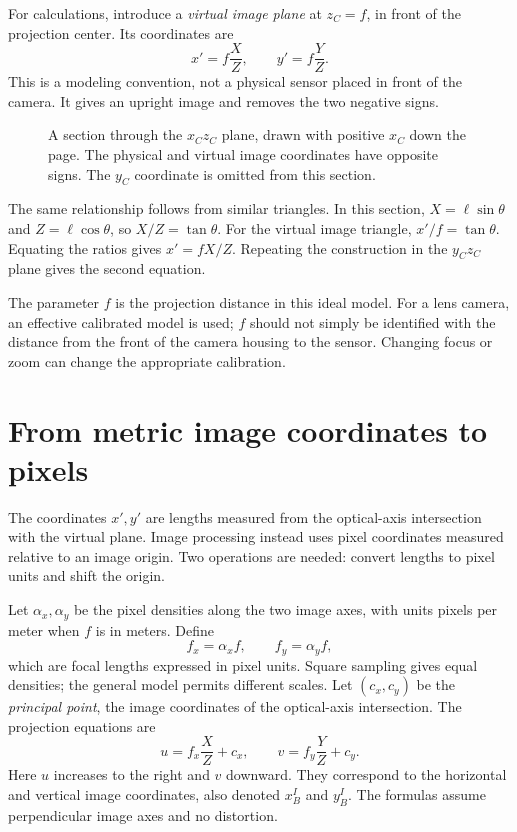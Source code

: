 For calculations, introduce a \emph{virtual image plane} at $z_C=f$,
in front of the projection center. Its coordinates are
\begin{equation}
 \boxed{x'=f\frac{X}{Z},\qquad y'=f\frac{Y}{Z}.}
 \label{eq:l07-metric}
\end{equation}
This is a modeling convention, not a physical sensor placed in front of the
camera. It gives an upright image and removes the two negative signs.

\begin{figure}[htbp]
\centering
\caption{A section through the $x_Cz_C$ plane, drawn with positive $x_C$
down the page. The physical and virtual image coordinates have opposite
signs. The $y_C$ coordinate is omitted from this section.}
\label{fig:l07-pinhole}
\end{figure}

The same relationship follows from similar triangles. In this section,
$X=\ell\sin\theta$ and $Z=\ell\cos\theta$, so $X/Z=\tan\theta$.
For the virtual image triangle, $x'/f=\tan\theta$. Equating the ratios
gives $x'=fX/Z$. Repeating the construction in the $y_Cz_C$ plane gives
the second equation.

The parameter $f$ is the projection distance in this ideal model. For a
lens camera, an effective calibrated model is used; $f$ should not simply
be identified with the distance from the front of the camera housing to
the sensor. Changing focus or zoom can change the appropriate calibration.

\section{From metric image coordinates to pixels}
The coordinates $x',y'$ are lengths measured from the optical-axis
intersection with the virtual plane. Image processing instead uses pixel
coordinates measured relative to an image origin. Two operations are needed:
convert lengths to pixel units and shift the origin.

Let $\alpha_x,\alpha_y$ be the pixel densities along the two image axes,
with units pixels per meter when $f$ is in meters. Define
\[
 f_x=\alpha_x f,\qquad f_y=\alpha_y f,
\]
which are focal lengths expressed in pixel units. Square sampling gives
equal densities; the general model permits different scales.
Let $(c_x,c_y)$ be the \emph{principal point}, the image coordinates of the
optical-axis intersection. The projection equations are
\begin{equation}
 \boxed{u=f_x\frac{X}{Z}+c_x,\qquad
 v=f_y\frac{Y}{Z}+c_y.}
 \label{eq:l07-projection}
\end{equation}
Here $u$ increases to the right and $v$ downward. They correspond to the
horizontal and vertical image coordinates, also denoted $x_B^I$ and $y_B^I$.
The formulas assume perpendicular image axes and no distortion.

